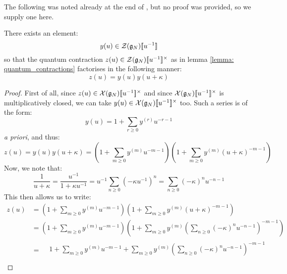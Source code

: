         The following was noted already at the end of \cite[Section 2]{guay_regelskis_twisted_yangians_for_symmetric_pairs_of_types_BCD}, but no proof was provided, so we supply one here.
        \begin{lemma} \label{lemma: quantum_pfaffians}
            There exists an element:
                $$y(u) \in \calZ(\g_N)[\![u^{-1}]\!]$$
            so that the quantum contraction $z(u) \in \calZ(\g_N)[\![u^{-1}]\!]^{\x}$ as in lemma \ref{lemma: quantum_contractions} factorises in the following manner:
                \begin{equation} \label{equation: quantum_pfaffians}
                    z(u) = y(u) y(u + \kappa)
                \end{equation}
        \end{lemma}
            \begin{proof}
                First of all, since $z(u) \in \calX(\g_N)[\![u^{-1}]\!]^{\x}$ and since $\calX(\g_N)[\![u^{-1}]\!]^{\x}$ is multiplicatively closed, we can take $y(u) \in \calX(\g_N)[\![u^{-1}]\!]^{\x}$ too. Such a series is of the form:
                    $$y(u) = 1 + \sum_{r \geq 0} y^{(r)} u^{-r - 1}$$
                \textit{a priori}, and thus:
                    $$z(u) = y(u) y(u + \kappa) = \left( 1 + \sum_{m \geq 0} y^{(m)} u^{-m - 1} \right) \left( 1 + \sum_{m \geq 0} y^{(m)} (u + \kappa)^{-m - 1} \right)$$
                Now, we note that:
                    $$\frac{1}{u + \kappa} = \frac{u^{-1}}{1 + \kappa u^{-1}} = u^{-1} \sum_{n \geq 0} (-\kappa u^{-1})^n = \sum_{n \geq 0} (-\kappa)^n u^{-n - 1}$$
                This then allows us to write:
                    $$
                        \begin{aligned}
                            z(u) & = \left( 1 + \sum_{m \geq 0} y^{(m)} u^{-m - 1} \right) \left( 1 + \sum_{m \geq 0} y^{(m)} (u + \kappa)^{-m - 1} \right)
                            \\
                            & = \left( 1 + \sum_{m \geq 0} y^{(m)} u^{-m - 1} \right) \left( 1 + \sum_{m \geq 0} y^{(m)} \left( \sum_{n \geq 0} (-\kappa)^n u^{-n - 1} \right)^{-m - 1} \right)
                            \\
                            & =
                            \begin{aligned}
                                & 1 + \sum_{m \geq 0} y^{(m)} u^{-m - 1} + \sum_{m \geq 0} y^{(m)} \left( \sum_{n \geq 0} (-\kappa)^n u^{-n - 1} \right)^{-m - 1}
                                \\

\end{aligned}
\end{aligned}$$
\end{proof}
